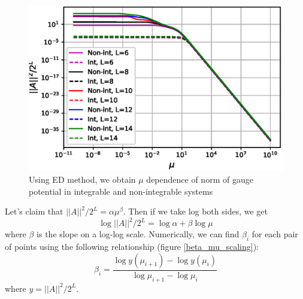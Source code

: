 \documentclass[11pt,a4paper]{article}
\begin{document}
\begin{figure}[!ht]
\begin{center}
\includegraphics[scale=0.72]{new_pics/v2_norm_mu_scaling.eps} 
\caption{Using ED method, we obtain  $\mu$ dependence of norm of gauge potential in integrable and non-integrable systems}
\label{mu_scaling}
\end{center}
\end{figure}

 Let's claim that $||A||^2/2^L=\alpha\mu^{\beta}$. Then if we take log both sides, we get
\begin{equation}
\log ||A||^2/2^L=\log \alpha+ \beta \log \mu
\end{equation}
where $\beta$ is the slope on a log-log scale. Numerically, we can find $\beta_i$ for each pair of points using the following relationship (figure \ref{beta_mu_scaling}):
\begin{equation}
\beta_i=\dfrac{\log y( \mu_{i+1}) -\log y( \mu_{i})} {\log \mu_{i+1}-\log \mu_{i}}
\end{equation}
where $y= ||A||^2/2^L$. 
\end{document}
